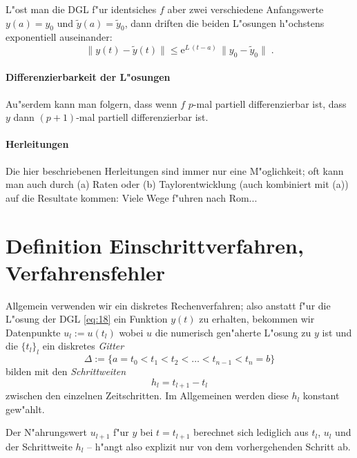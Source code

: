 \documentclass[a4paper]{book}
\newcommand{\abs}{\bigskip \noindent}
\newcommand{\E}{\ensuremath{\mathrm e}}
\begin{document}
L"ost man die DGL f"ur identsiches $f$ aber zwei verschiedene
Anfangswerte $y(a) = y_0$ und $\tilde y(a) = \tilde y_0$, dann driften die
beiden L"osungen h"ochstens exponentiell auseinander:
\begin{equation}
  \label{eq:20}
  \| y(t) - \tilde y(t) \| \leq \E^{L \, (t-a)} \, \| y_0 - \tilde
  y_0\| \;.
\end{equation}

\paragraph{Differenzierbarkeit der L"osungen}
\label{sec:differenzierbarkeit_der_losungen}

Au"serdem kann man folgern, dass wenn $f$ $p$-mal partiell
differenzierbar ist, dass $y$ dann $(p+1)$-mal partiell
differenzierbar ist.


\abs
\paragraph{Herleitungen}
\label{sec:herleitungen}
Die hier beschriebenen Herleitungen sind immer nur eine M"oglichkeit;
oft kann man auch durch (a) Raten oder (b) Taylorentwicklung
(auch kombiniert mit (a)) auf die Resultate kommen: Viele Wege f"uhren
nach Rom...




\section{Definition Einschrittverfahren, Verfahrensfehler}
\label{sec:definition_einschrittverfahren}


Allgemein verwenden wir ein diskretes Rechenverfahren; also anstatt
f"ur die L"osung der DGL \eqref{eq:18} ein Funktion $y(t)$ zu
erhalten, bekommen wir Datenpunkte $u_l := u(t_l)$ wobei $u$ die
numerisch gen"aherte L"osung zu $y$ ist und die $\{ t_l \}_l$ ein
diskretes \emph{Gitter}
\begin{equation}
  \label{eq:21}
  \Delta := \{ a = t_0 < t_1 < t_2 < \dots < t_{n-1} < t_n = b \}
\end{equation}
bilden mit den \emph{Schrittweiten}
\begin{equation}
  \label{eq:22}
  h_l = t_{l+1} - t_l
\end{equation}
zwischen den einzelnen Zeitschritten. Im Allgemeinen werden diese
$h_l$ konstant gew"ahlt.


\begin{Def}
  [Einschrittverfahren]
Der N"ahrungswert $u_{l+1}$ f"ur $y$ bei $t = t_{l+1}$ berechnet sich
lediglich aus $t_l$, $u_l$ und der Schrittweite $h_l$ -- h"angt also
explizit nur von dem vorhergehenden Schritt ab.
\end{Def}
\end{document}
